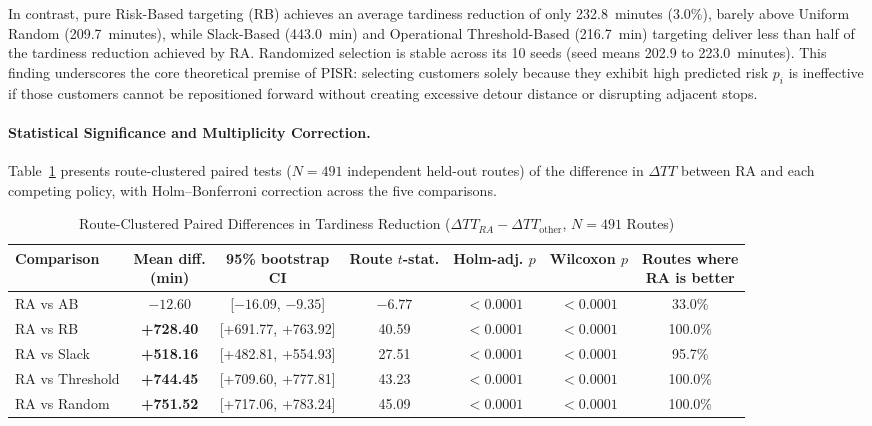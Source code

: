 \documentclass[11pt,a4paper]{article}
\begin{document}
In contrast, pure Risk-Based targeting (RB) achieves an average tardiness reduction of only 232.8~minutes (3.0\%), barely above Uniform Random (209.7~minutes), while Slack-Based (443.0~min) and Operational Threshold-Based (216.7~min) targeting deliver less than half of the tardiness reduction achieved by RA. Randomized selection is stable across its 10 seeds (seed means 202.9 to 223.0~minutes). This finding underscores the core theoretical premise of PISR: selecting customers solely because they exhibit high predicted risk $p_i$ is ineffective if those customers cannot be repositioned forward without creating excessive detour distance or disrupting adjacent stops.

\paragraph{Statistical Significance and Multiplicity Correction.}
Table~\ref{tab:statistical-tests} presents route-clustered paired tests ($N = 491$ independent held-out routes) of the difference in $\Delta TT$ between RA and each competing policy, with Holm--Bonferroni correction across the five comparisons.

\begin{table}[htbp]
\centering
\caption{Route-Clustered Paired Differences in Tardiness Reduction ($\Delta TT_{RA} - \Delta TT_{\text{other}}$, $N = 491$ Routes)}
\label{tab:statistical-tests}
\scriptsize
\setlength{\tabcolsep}{3pt}
\renewcommand{\arraystretch}{1.15}
\begin{tabular}{lcccccc}
\toprule
\textbf{Comparison} & \shortstack{\textbf{Mean diff.}\\\textbf{(min)}} & \shortstack{\textbf{95\% bootstrap}\\\textbf{CI}} & \shortstack{\textbf{Route}\\\textbf{$t$-stat.}} & \shortstack{\textbf{Holm-adj.}\\\textbf{$p$}} & \shortstack{\textbf{Wilcoxon}\\\textbf{$p$}} & \shortstack{\textbf{Routes where}\\\textbf{RA is better}} \\
\midrule
RA vs AB & $-12.60$ & [$-16.09$, $-9.35$] & $-6.77$ & $<0.0001$ & $<0.0001$ & 33.0\% \\
RA vs RB & \textbf{+728.40} & [+691.77, +763.92] & 40.59 & $<0.0001$ & $<0.0001$ & 100.0\% \\
RA vs Slack & \textbf{+518.16} & [+482.81, +554.93] & 27.51 & $<0.0001$ & $<0.0001$ & 95.7\% \\
RA vs Threshold & \textbf{+744.45} & [+709.60, +777.81] & 43.23 & $<0.0001$ & $<0.0001$ & 100.0\% \\
RA vs Random & \textbf{+751.52} & [+717.06, +783.24] & 45.09 & $<0.0001$ & $<0.0001$ & 100.0\% \\
\bottomrule
\end{tabular}
\end{table}
\end{document}
